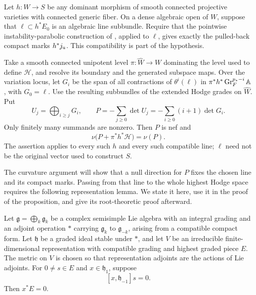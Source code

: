 \begin{proposition}\label{prop:tail-rank}
Let $h:W\to S$ be any dominant morphism of smooth
connected projective varieties with connected generic
fiber.  On a dense algebraic open of $W$, suppose that
$\ell\subset h^*E_0$ is an algebraic line subbundle.
Require that the pointwise instability-parabolic
construction of , applied to
$\ell$, gives exactly the pulled-back compact marks
$h^*j_{\rm u}$.  This compatibility is part of the
hypothesis.

Take a smooth connected unipotent level
$\pi:\widehat W\to W$ dominating the level used to
define $\mathcal H$, and resolve its boundary and the
generated subspace maps.  Over the variation locus,
let $G_i$ be the span of all contractions of
$\theta^i(\ell)$ in
$\pi^*h^*\operatorname{Gr}_F^{p_*-i}\mathbb A$, with $G_0=\ell$.
Use the resulting subbundles of the extended Hodge
grades on $\widehat W$.  Put
\begin{equation}\label{eq:tail-line-definition}
 U_j=\bigoplus_{i\geq j}G_i,
 \qquad
 P=-\sum_{j\geq0}\det U_j
   =-\sum_{i\geq0}(i+1)\det G_i.
\end{equation}
Only finitely many summands are nonzero.  Then $P$ is
nef and
\begin{equation}\label{eq:tail-rank-equality}
              \nu\bigl(P+\pi^*h^*\mathcal H\bigr)=\nu(P).
\end{equation}
The assertion applies to every such $h$ and every such
compatible line; $\ell$ need not be the original vector
used to construct $S$.
\end{proposition}

The curvature argument will show that a null direction for $P$ fixes
the chosen line and its compact marks.  Passing from that line to the
whole highest Hodge space requires the following representation lemma.
We state it here, use it in the proof of the proposition,
and give its root-theoretic proof afterward.

\begin{lemma}\label{lem:degree-one-root}
Let $\mathfrak g=\bigoplus_k\mathfrak g_k$ be a complex
semisimple Lie algebra with an integral grading and an
adjoint operation $*$ carrying $\mathfrak g_k$ to
$\mathfrak g_{-k}$, arising from a compatible compact
form.  Let $\mathfrak h$ be a graded ideal stable under
$*$, and let $V$ be an irreducible finite-dimensional
representation with compatible grading and highest
graded piece $E$.  The metric on $V$ is chosen so that
representation adjoints are the actions of Lie adjoints.
For $0\ne s\in E$ and $x\in\mathfrak h_1$, suppose
\begin{equation}\label{eq:root-annihilation-hypothesis}
                         [x,\mathfrak h_{-1}]s=0.
\end{equation}
Then $x^*E=0$.
\end{lemma}

